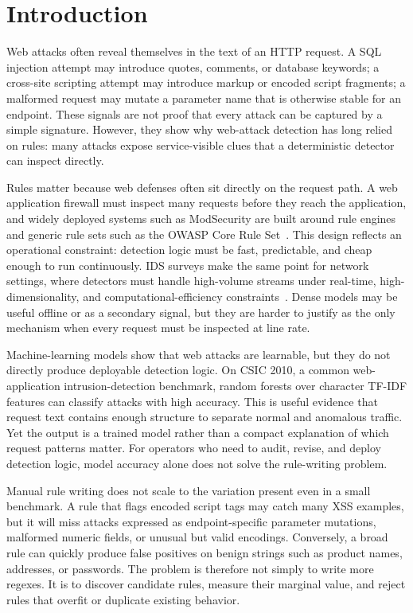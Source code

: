 \documentclass[letterpaper,twocolumn,10pt]{article}
\begin{document}
\section{Introduction}

Web attacks often reveal themselves in the text of an HTTP request. A SQL injection attempt may introduce quotes, comments, or database keywords; a cross-site scripting attempt may introduce markup or encoded script fragments; a malformed request may mutate a parameter name that is otherwise stable for an endpoint. These signals are not proof that every attack can be captured by a simple signature. However, they show why web-attack detection has long relied on rules: many attacks expose service-visible clues that a deterministic detector can inspect directly.

Rules matter because web defenses often sit directly on the request path. A web application firewall must inspect many requests before they reach the application, and widely deployed systems such as ModSecurity are built around rule engines and generic rule sets such as the OWASP Core Rule Set~\cite{OWASPModSecurity,OWASPCoreRuleSet}. This design reflects an operational constraint: detection logic must be fast, predictable, and cheap enough to run continuously. IDS surveys make the same point for network settings, where detectors must handle high-volume streams under real-time, high-dimensionality, and computational-efficiency constraints~\cite{Adnan2021IoTIDSReview}. Dense models may be useful offline or as a secondary signal, but they are harder to justify as the only mechanism when every request must be inspected at line rate.

Machine-learning models show that web attacks are learnable, but they do not directly produce deployable detection logic. On CSIC 2010, a common web-application intrusion-detection benchmark, random forests over character TF-IDF features can classify attacks with high accuracy. This is useful evidence that request text contains enough structure to separate normal and anomalous traffic. Yet the output is a trained model rather than a compact explanation of which request patterns matter. For operators who need to audit, revise, and deploy detection logic, model accuracy alone does not solve the rule-writing problem.

Manual rule writing does not scale to the variation present even in a small benchmark. A rule that flags encoded script tags may catch many XSS examples, but it will miss attacks expressed as endpoint-specific parameter mutations, malformed numeric fields, or unusual but valid encodings. Conversely, a broad rule can quickly produce false positives on benign strings such as product names, addresses, or passwords. The problem is therefore not simply to write more regexes. It is to discover candidate rules, measure their marginal value, and reject rules that overfit or duplicate existing behavior.
\end{document}

